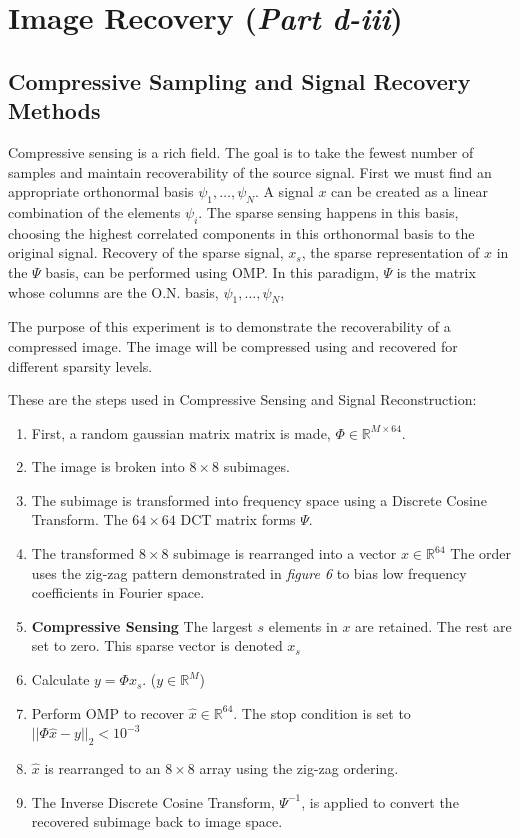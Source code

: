 \documentclass{article}
\begin{document}

\newpage
\section{Image Recovery ({\it Part d-iii})}

\subsection*{Compressive Sampling and Signal Recovery Methods}

Compressive sensing is a rich field.
The goal is to take the fewest number of samples and maintain recoverability of the source signal.
First we must find an appropriate orthonormal basis ${\psi_1, \ldots, \psi_N}$.
A signal $x$ can be created as a linear combination of the elements $\psi_i$.
The sparse sensing happens in this basis, choosing the highest correlated components in this orthonormal basis to the original signal.
Recovery of the sparse signal, $x_s$, the sparse representation of $x$ in the $\Psi$ basis, can be performed using OMP.
In this paradigm, $\Psi$ is the matrix whose columns are the O.N. basis, ${\psi_1, \ldots, \psi_N}$,

The purpose of this experiment is to demonstrate the recoverability of a compressed image.
The image will be compressed using and recovered for different sparsity levels.

These are the steps used in Compressive Sensing and Signal Reconstruction:
\begin{enumerate}
    \item First, a random gaussian matrix matrix is made, $\Phi \in \mathbb{R}^{M \times 64}$.
    \item The image is broken into $8 \times 8$ subimages.
    \item The subimage is transformed into frequency space using a Discrete Cosine Transform.
        The $64 \times 64$ DCT matrix forms $\Psi$.
    \item The transformed $8 \times 8$ subimage is rearranged into a vector $x \in \mathbb{R}^{64}$
        The order uses the zig-zag pattern demonstrated in {\it figure 6} to bias low frequency coefficients in Fourier space.
    \item {\bf Compressive Sensing} The largest $s$ elements in $x$ are retained. The rest are set to zero. This sparse vector is denoted $x_s$
    \item Calculate $y = \Phi x_s$. ($y \in \mathbb{R}^M$)
    \item Perform OMP to recover $\hat{x} \in \mathbb{R}^{64}$.
        The stop condition is set to $||\Phi \hat{x} - y||_2 < 10^{-3}$
    \item $\hat{x}$ is rearranged to an $8 \times 8$ array using the zig-zag ordering.
    \item The Inverse Discrete Cosine Transform, $\Psi^{-1}$, is applied to convert the recovered subimage back to image space.
\end{enumerate}
\end{document}
